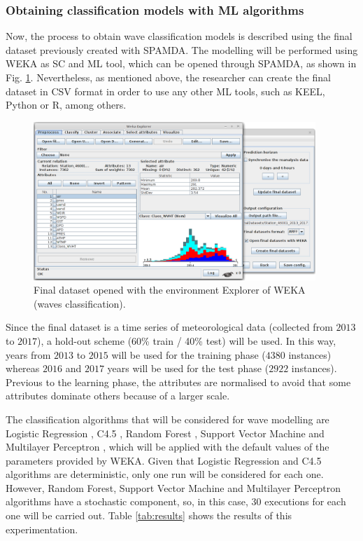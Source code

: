 \documentclass[energies,article,submit,moreauthors,pdftex]{Definitions/mdpi}
\begin{document}
		\subsubsection{Obtaining classification models with ML algorithms}
		
			Now, the process to obtain wave classification models is described using the final dataset previously created with SPAMDA. The modelling will be performed using WEKA as SC and ML tool, which can be opened through SPAMDA, as shown in Fig. \ref{fig:openigFinalDatasetWeka}. Nevertheless, as mentioned above, the researcher can create the final dataset in CSV format in order to use any other ML tools, such as KEEL, Python or R, among others.
			
			\begin{figure}[ht!]
				\centering
				\includegraphics[width=0.95\textwidth]{figures/FigureOpeningFinalDatasetWeka.png}
				\caption{Final dataset opened with the environment Explorer of WEKA (waves classification).}
				\label{fig:openigFinalDatasetWeka}
			\end{figure}
			
			Since the final dataset is a time series of meteorological data (collected from $2013$ to $2017$), a hold-out scheme (60\% train / 40\% test) will be used. In this way, years from $2013$ to $2015$ will be used for the training phase ($4380$ instances) whereas $2016$ and $2017$ years will be used for the test phase ($2922$ instances). Previous to the learning phase, the attributes are normalised to avoid that some attributes dominate others because of a larger scale.
			
			The classification algorithms that will be considered for wave modelling are Logistic Regression \cite{hosmer2013applied}, C4.5 \cite{quinlan2014c4}, Random Forest \cite{breiman2001random}, Support Vector Machine \cite{cortes1995support} and Multilayer Perceptron \cite{haykin1994neural}, which will be applied with the default values of the parameters provided by WEKA. Given that Logistic Regression and C4.5 algorithms are deterministic, only one run will be considered for each one. However, Random Forest, Support Vector Machine and Multilayer Perceptron algorithms have a stochastic component, so, in this case, 30 executions for each one will be carried out. Table \ref{tab:results} shows the results of this experimentation.
			
\end{document}
